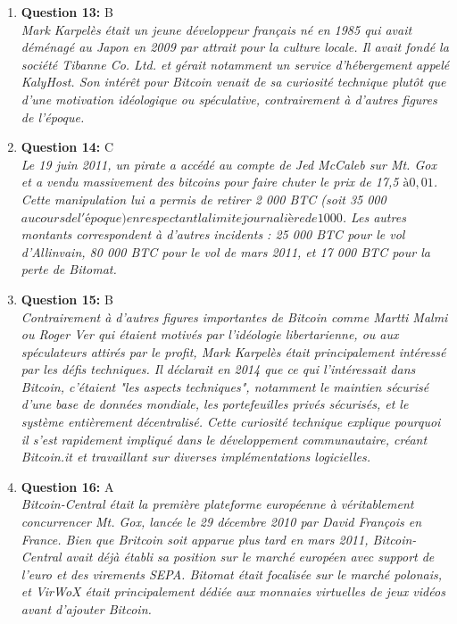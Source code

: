 \documentclass[12pt,a4paper]{article}
\begin{document}
\begin{enumerate}
\item \textbf{Question 13:} B
\\ \textit{Mark Karpelès était un jeune développeur français né en 1985 qui avait déménagé au Japon en 2009 par attrait pour la culture locale. Il avait fondé la société Tibanne Co. Ltd. et gérait notamment un service d'hébergement appelé KalyHost. Son intérêt pour Bitcoin venait de sa curiosité technique plutôt que d'une motivation idéologique ou spéculative, contrairement à d'autres figures de l'époque.}

\item \textbf{Question 14:} C
\\ \textit{Le 19 juin 2011, un pirate a accédé au compte de Jed McCaleb sur Mt. Gox et a vendu massivement des bitcoins pour faire chuter le prix de 17,5 $ à 0,01 $. Cette manipulation lui a permis de retirer 2 000 BTC (soit 35 000 $ au cours de l'époque) en respectant la limite journalière de 1 000 $. Les autres montants correspondent à d'autres incidents : 25 000 BTC pour le vol d'Allinvain, 80 000 BTC pour le vol de mars 2011, et 17 000 BTC pour la perte de Bitomat.}

\item \textbf{Question 15:} B
\\ \textit{Contrairement à d'autres figures importantes de Bitcoin comme Martti Malmi ou Roger Ver qui étaient motivés par l'idéologie libertarienne, ou aux spéculateurs attirés par le profit, Mark Karpelès était principalement intéressé par les défis techniques. Il déclarait en 2014 que ce qui l'intéressait dans Bitcoin, c'étaient "les aspects techniques", notamment le maintien sécurisé d'une base de données mondiale, les portefeuilles privés sécurisés, et le système entièrement décentralisé. Cette curiosité technique explique pourquoi il s'est rapidement impliqué dans le développement communautaire, créant Bitcoin.it et travaillant sur diverses implémentations logicielles.}

\item \textbf{Question 16:} A
\\ \textit{Bitcoin-Central était la première plateforme européenne à véritablement concurrencer Mt. Gox, lancée le 29 décembre 2010 par David François en France. Bien que Britcoin soit apparue plus tard en mars 2011, Bitcoin-Central avait déjà établi sa position sur le marché européen avec support de l'euro et des virements SEPA. Bitomat était focalisée sur le marché polonais, et VirWoX était principalement dédiée aux monnaies virtuelles de jeux vidéos avant d'ajouter Bitcoin.}


\end{enumerate}
\end{document}
